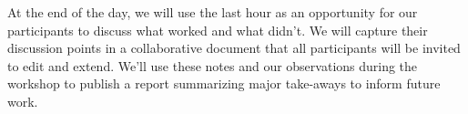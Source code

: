 At the end of the day, we will use the last hour as an opportunity for our participants to discuss what worked and what didn't.  We will capture their discussion points in a collaborative document that all participants will be invited to edit and extend.  We'll use these notes and our observations during the workshop to publish a report summarizing major take-aways to inform future work.
